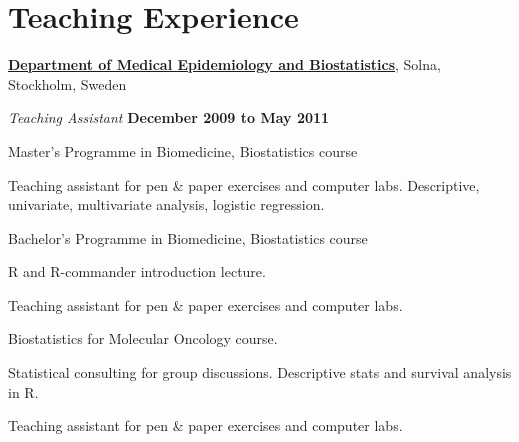 %
%

%
%
\section{Teaching Experience}
\href{http://ki.se/ki/jsp/polopoly.jsp?d=9600}{\textbf{Department of Medical Epidemiology and Biostatistics}}, Solna, Stockholm, Sweden
\begin{outerlist}
\item[] \textit{Teaching Assistant}
    \hfill \textbf{December 2009 to May 2011}
    \begin{innerlist}

        \item Master's Programme in Biomedicine, Biostatistics course
        \begin{innerlist}
	    \item Teaching assistant for pen \& paper exercises and computer labs. Descriptive, univariate, multivariate analysis, logistic regression.
        \end{innerlist}

        \halfblankline

        \item Bachelor's Programme in Biomedicine, Biostatistics course
        \begin{innerlist}
	    \item R and R-commander introduction lecture.
	    \item Teaching assistant for pen \& paper exercises and computer labs.
        \end{innerlist}

        \halfblankline

	\item Biostatistics for Molecular Oncology course.
        \begin{innerlist}
            \item Statistical consulting for group discussions. Descriptive stats and survival analysis in R.
	    \item Teaching assistant for pen \& paper exercises and computer labs.
        \end{innerlist}

    \end{innerlist}
\end{outerlist}

